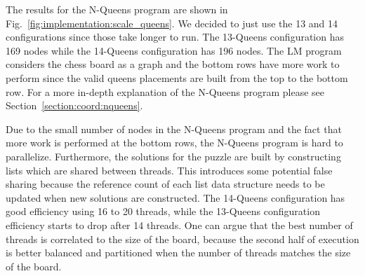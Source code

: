 The results for the N-Queens program are shown in
Fig.~\ref{fig:implementation:scale_queens}. We decided to just use the 13 and 14
configurations since those take longer to run. The 13-Queens configuration has
169 nodes while the 14-Queens configuration has 196 nodes. The LM program
considers the chess board as a graph and the bottom rows have more work to
perform since the valid queens placements are built from the top to the bottom
row. For a more in-depth explanation of the N-Queens program please see
Section~\ref{section:coord:nqueens}.

Due to the small number of nodes in the N-Queens program and the fact that more
work is performed at the bottom rows, the N-Queens program is hard to
parallelize. Furthermore, the solutions for the puzzle are built by constructing
lists which are shared between threads. This introduces some potential false
sharing because the reference count of each list data structure needs to be
updated when new solutions are constructed. The 14-Queens configuration has good
efficiency using 16 to 20 threads, while the 13-Queens configuration efficiency
starts to drop after 14 threads. One can argue that the best number of threads
is correlated to the size of the board, because the second half of execution is
better balanced and partitioned when the number of threads matches the size of
the board.

